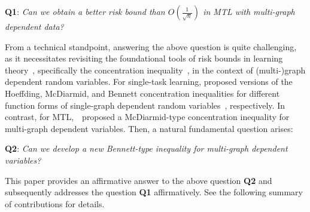 \documentclass{article}
\begin{document}
\quad \textbf{Q1}: \emph{Can we obtain a better risk bound than $O(\frac{1}{\sqrt{n}})$ in MTL with multi-graph dependent data?}

From a technical standpoint, answering the above question is quite challenging, as it necessitates revisiting the foundational tools of risk bounds in learning theory~\cite{99learningtheory,shalev2014understanding,mohri2018foundations}, specifically the concentration inequality~\cite{concentration13initial}, in the context of (multi-)graph dependent random variables.
For single-task learning, \cite{jason04,usunier2005generalization,zhang19mcdiarmid,ralaivola2015entropy} proposed versions of the Hoeffding, McDiarmid, and Bennett concentration inequalities for different function forms of single-graph dependent random variables~\cite{zhang2022generalization}, respectively. 
In contrast, for MTL,~\cite{wu2023macro-auc}~proposed a McDiarmid-type concentration inequality for multi-graph dependent variables. Then, a natural fundamental question arises:

\quad \textbf{Q2}: \emph{Can we develop a new Bennett-type inequality for multi-graph dependent variables?}

This paper provides an affirmative answer to the above question \textbf{Q2} and subsequently addresses the question \textbf{Q1} affirmatively. 
See the following summary of contributions for details.
\end{document}

